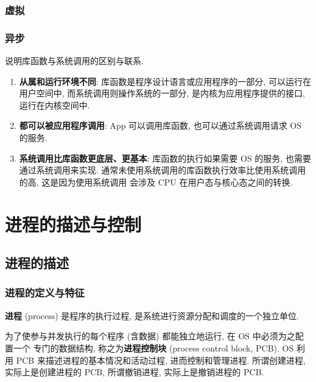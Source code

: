 \documentclass[10pt,UTF8]{book} %
\begin{document}
\subsection{虚拟}
\subsection{异步}

\begin{example}
    说明库函数与系统调用的区别与联系.
    \begin{cmt}
        \begin{enumerate}[label={$\left.\arabic*\right)$}, itemsep=0pt]
            \item {\color{red} \textbf{从属和运行环境不同}: 库函数是程序设计语言或应用程序的一部分, 
            可以运行在用户空间中,
            而系统调用则操作系统的一部分, 是内核为应用程序提供的接口, 运行在内核空间中.}
            \item \textbf{都可以被应用程序调用}: App 可以调用库函数, 也可以通过系统调用请求 OS 的服务.
            \item \textbf{系统调用比库函数更底层、更基本}: 库函数的执行如果需要 OS 的服务, 也需要通过系统调用来实现.
            {\color{red} 通常未使用系统调用的库函数执行效率比使用系统调用的高, 这是因为使用系统调用
            会涉及 CPU 在用户态与核心态之间的转换.}
        \end{enumerate}
    \end{cmt}
\end{example}

\chapter{进程的描述与控制}

\section{进程的描述}

\subsection{进程的定义与特征}

\textbf{进程} (process) 是程序的执行过程, 是系统进行资源分配和调度的一个独立单位.

为了使参与并发执行的每个程序 (含数据) 都能独立地运行, 在 OS 中必须为之配置一个
专门的数据结构, 称之为\textbf{进程控制块} (process control block, PCB).
OS 利用 PCB 来描述进程的基本情况和活动过程, 进而控制和管理进程.
所谓创建进程, 实际上是创建进程的 PCB, 所谓撤销进程, 实际上是撤销进程的 PCB.
\end{document}
